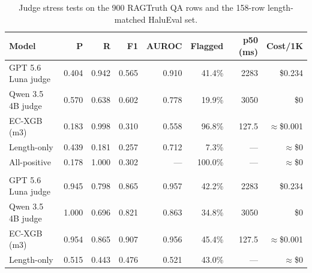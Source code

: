 \documentclass[a4paper,fleqn]{cas-sc}
\begin{document}
\begin{table}[pos=htbp]
  \centering
  \caption{Judge stress tests on the 900 RAGTruth QA rows and the 158-row length-matched HaluEval set.}
  \label{tab:judge}
  \setlength{\tabcolsep}{4pt}
  \begin{tabular}{lrrrrrrr}
    \toprule
    \textbf{Model}     & \textbf{P} & \textbf{R} & \textbf{F1} & \textbf{AUROC} & \textbf{Flagged} & \textbf{p50 (ms)} & \textbf{Cost/1K} \\
    \midrule
    GPT 5.6 Luna judge & 0.404      & 0.942      & 0.565       & 0.910          & 41.4\%           & 2283              & \$0.234          \\
    Qwen 3.5 4B judge  & 0.570      & 0.638      & 0.602       & 0.778          & 19.9\%           & 3050              & \$0              \\
    EC-XGB (m3)        & 0.183      & 0.998      & 0.310       & 0.558          & 96.8\%           & 127.5             & $\approx$\$0.001 \\
    Length-only        & 0.439      & 0.181      & 0.257       & 0.712          & 7.3\%            & ---               & $\approx$\$0     \\
    All-positive       & 0.178      & 1.000      & 0.302       & ---            & 100.0\%          & ---               & $\approx$\$0     \\
    \addlinespace
    \multicolumn{8}{l}{\emph{Length-matched HaluEval, 158 rows, 50\% positive}}                                                           \\
    GPT 5.6 Luna judge & 0.945      & 0.798      & 0.865       & 0.957          & 42.2\%           & 2283              & \$0.234          \\
    Qwen 3.5 4B judge  & 1.000      & 0.696      & 0.821       & 0.863          & 34.8\%           & 3050              & \$0              \\
    EC-XGB (m3)        & 0.954      & 0.865      & 0.907       & 0.956          & 45.4\%           & 127.5             & $\approx$\$0.001 \\
    Length-only        & 0.515      & 0.443      & 0.476       & 0.521          & 43.0\%           & ---               & $\approx$\$0     \\
    \bottomrule
  \end{tabular}
\end{table}
\end{document}
